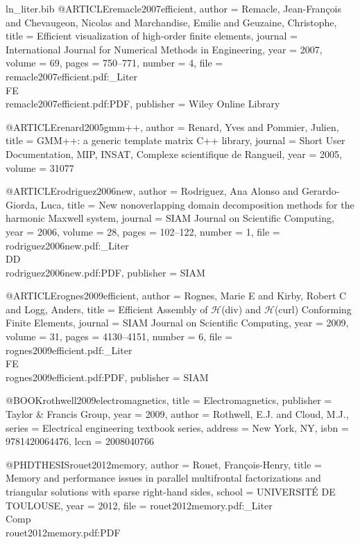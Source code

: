 \begin{filecontents*}{ln_liter.bib}
@ARTICLE{remacle2007efficient,
  author = {Remacle, Jean-Fran{\c{c}}ois and Chevaugeon, Nicolas and Marchandise,
	Emilie and Geuzaine, Christophe},
  title = {Efficient visualization of high-order finite elements},
  journal = {International Journal for Numerical Methods in Engineering},
  year = {2007},
  volume = {69},
  pages = {750--771},
  number = {4},
  file = {remacle2007efficient.pdf:_Liter\\FE\\remacle2007efficient.pdf:PDF},
  publisher = {Wiley Online Library}
}

@ARTICLE{renard2005gmm++,
  author = {Renard, Yves and Pommier, Julien},
  title = {{GMM++}: a generic template matrix {C++} library},
  journal = {Short User Documentation, MIP, INSAT, Complexe scientifique de Rangueil},
  year = {2005},
  volume = {31077}
}

@ARTICLE{rodriguez2006new,
  author = {Rodriguez, Ana Alonso and Gerardo-Giorda, Luca},
  title = {New nonoverlapping domain decomposition methods for the harmonic
	{M}axwell system},
  journal = {SIAM Journal on Scientific Computing},
  year = {2006},
  volume = {28},
  pages = {102--122},
  number = {1},
  file = {rodriguez2006new.pdf:_Liter\\DD\\rodriguez2006new.pdf:PDF},
  publisher = {SIAM}
}

@ARTICLE{rognes2009efficient,
  author = {Rognes, Marie E and Kirby, Robert C and Logg, Anders},
  title = {Efficient Assembly of $\mathcal{H}$(div) and $\mathcal{H}$(curl)
	Conforming Finite Elements},
  journal = {SIAM Journal on Scientific Computing},
  year = {2009},
  volume = {31},
  pages = {4130--4151},
  number = {6},
  file = {rognes2009efficient.pdf:_Liter\\FE\\rognes2009efficient.pdf:PDF},
  publisher = {SIAM}
}

@BOOK{rothwell2009electromagnetics,
  title = {Electromagnetics},
  publisher = {Taylor \& Francis Group},
  year = {2009},
  author = {Rothwell, E.J. and Cloud, M.J.},
  series = {Electrical engineering textbook series},
  address = {{New York}, NY},
  isbn = {9781420064476},
  lccn = {2008040766}
}

@PHDTHESIS{rouet2012memory,
  author = {Rouet, Fran{\c{c}}ois-Henry},
  title = {Memory and performance issues in parallel multifrontal factorizations
	and triangular solutions with sparse right-hand sides},
  school = {UNIVERSIT\'E DE TOULOUSE},
  year = {2012},
  file = {rouet2012memory.pdf:_Liter\\Comp\\rouet2012memory.pdf:PDF}
}


\end{filecontents*}
